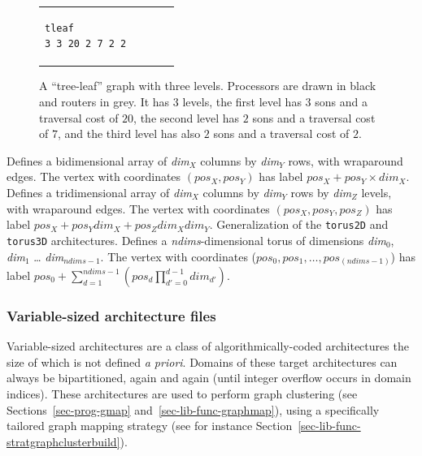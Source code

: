 \begin{itemize}
\begin{figure}[hbt]
\begin{tabular}{p{0.69\linewidth}@{}p{0.29\linewidth}}
\begin{center}
{\begin{verbatim}
tleaf
3 3 20 2 7 2 2
\end{verbatim}
}
\end{center}
\end{tabular}
\caption{A ``tree-leaf'' graph with three levels. Processors are drawn
in black and routers in grey. It has $3$ levels, the first level has
$3$ sons and a traversal cost of $20$, the second level has $2$ sons
and a traversal cost of $7$, and the third level has also $2$ sons and
a traversal cost of $2$.}
\label{fig-graf-treeleaf}
\end{figure}
Defines a bidimensional array of {\it dim$_X$} columns by {\it dim$_Y$}
rows, with wraparound edges.
The vertex with coordinates $(\mathit{pos_X},\mathit{pos_Y})$ has label
$\mathit{pos_X} + \mathit{pos_Y} \times \mathit{dim_X}$.
Defines a tridimensional array of {\it dim$_X$} columns by {\it dim$_Y$}
rows by {\it dim$_Z$} levels, with wraparound edges. The vertex with
coordinates $(\mathit{pos_X},\mathit{pos_Y},\mathit{pos_Z})$ has
label
$\mathit{pos_X} + \mathit{pos_Y} \mathit{dim_X} + \mathit{pos_Z} \mathit{dim_X} \mathit{dim_Y}$.
Generalization of the \texttt{torus2D} and \texttt{torus3D}
architectures. Defines a \textit{ndims}-dimensional torus of
dimensions \textit{dim$_0$}, \textit{dim$_1$} \ldots
\textit{dim$_{ndims - 1}$}. The vertex with coordinates 
($\mathit{pos_0},\mathit{pos_1},\ldots,\mathit{pos_{(ndims - 1)}}$)
has label $\mathit{pos_0} + \sum_{d=1}^{ndims - 1}\left(\mathit{pos_d} \prod_{d'=0}^{d-1}\mathit{dim_{d'}}\right)$.
\end{itemize}

\subsubsection{Variable-sized architecture files}
\label{sec-file-target-variable}

Variable-sized architectures are a class of algorithmically-coded
architectures the size of which is not defined {\it a priori}. Domains
of these target architectures can always be bipartitioned, again and
again (until integer overflow occurs in domain indices). These
architectures are used to perform graph clustering (see
Sections~\ref{sec-prog-gmap} and~\ref{sec-lib-func-graphmap}),
using a specifically tailored graph mapping strategy (see for instance
Section~\ref{sec-lib-func-stratgraphclusterbuild}).

